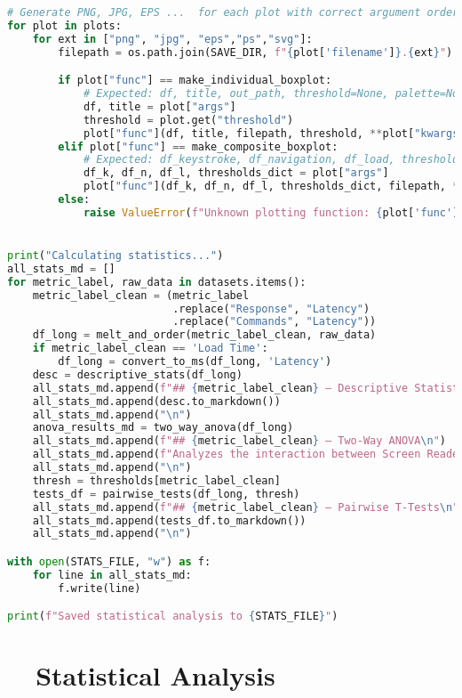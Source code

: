 \begin{lstlisting}[language=python]
# Generate PNG, JPG, EPS ...  for each plot with correct argument ordering
for plot in plots:
    for ext in ["png", "jpg", "eps","ps","svg"]:
        filepath = os.path.join(SAVE_DIR, f"{plot['filename']}.{ext}")

        if plot["func"] == make_individual_boxplot:
            # Expected: df, title, out_path, threshold=None, palette=None
            df, title = plot["args"]
            threshold = plot.get("threshold")
            plot["func"](df, title, filepath, threshold, **plot["kwargs"])
        elif plot["func"] == make_composite_boxplot:
            # Expected: df_keystroke, df_navigation, df_load, thresholds_dict, out_path, palette=None
            df_k, df_n, df_l, thresholds_dict = plot["args"]
            plot["func"](df_k, df_n, df_l, thresholds_dict, filepath, **plot["kwargs"])
        else:
            raise ValueError(f"Unknown plotting function: {plot['func']}")


print("Calculating statistics...")
all_stats_md = []
for metric_label, raw_data in datasets.items():
    metric_label_clean = (metric_label
                          .replace("Response", "Latency")
                          .replace("Commands", "Latency"))
    df_long = melt_and_order(metric_label_clean, raw_data)
    if metric_label_clean == 'Load Time':
        df_long = convert_to_ms(df_long, 'Latency')
    desc = descriptive_stats(df_long)
    all_stats_md.append(f"## {metric_label_clean} — Descriptive Statistics\n")
    all_stats_md.append(desc.to_markdown())
    all_stats_md.append("\n")
    anova_results_md = two_way_anova(df_long)
    all_stats_md.append(f"## {metric_label_clean} — Two-Way ANOVA\n")
    all_stats_md.append(f"Analyzes the interaction between Screen Reader and RAM.\n\n{anova_results_md}\n")
    all_stats_md.append("\n")
    thresh = thresholds[metric_label_clean]
    tests_df = pairwise_tests(df_long, thresh)
    all_stats_md.append(f"## {metric_label_clean} — Pairwise T-Tests\n")
    all_stats_md.append(tests_df.to_markdown())
    all_stats_md.append("\n")

with open(STATS_FILE, "w") as f:
    for line in all_stats_md:
        f.write(line)

print(f"Saved statistical analysis to {STATS_FILE}")


\end{lstlisting}

\section{~~Statistical Analysis}
